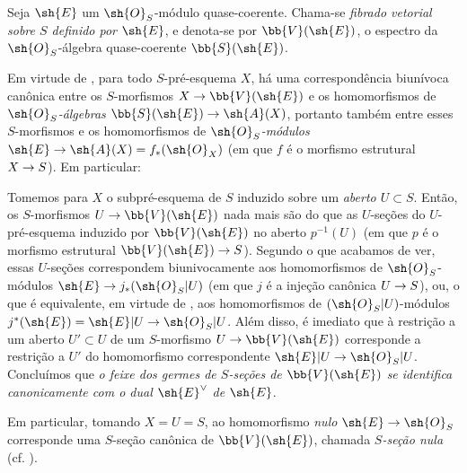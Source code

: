 \documentclass[oneside,10pt]{amsart}
\makeatletter
\providecommand{\dual}{}\renewcommand{\dual}[1]{{#1}^{\vee}}
\newcommand{\ega@arrow}[2]{\mathchoice{#1}{#2}{#2}{#2}}
\renewcommand{\to}{\ega@arrow{\longrightarrow}{\rightarrow}}
\newcommand{\oldpage}[2][]{\marginnote{\normalfont\footnotesize\textbf{#1}~|~#2}\ignorespaces}
\let\EGAOriginalLabel\label
\renewcommand{\label}[1]{\phantomsection\EGAOriginalLabel{#1}}
\makeatother
\begin{document}
\begin{definition}[1.7.8]
\label{II.1.7.8}
Seja $\sh{E}$ um $\sh{O}_S$-módulo quase-coerente.
Chama-se \emph{fibrado vetorial sobre $S$ definido por $\sh{E}$}, e denota-se por $\bb{V}(\sh{E})$, o espectro  da $\sh{O}_S$-álgebra quase-coerente $\bb{S}(\sh{E})$.
\end{definition}

Em virtude de , para todo $S$-pré-esquema $X$, há uma correspondência biunívoca canônica entre os $S$-morfismos $X\to\bb{V}(\sh{E})$ e os homomorfismos de \emph{$\sh{O}_S$-álgebras $\bb{S}(\sh{E})\to\sh{A}(X)$}, portanto também entre esses $S$-morfismos e os homomorfismos de \emph{$\sh{O}_S$-módulos $\sh{E}\to\sh{A}(X)=f_*(\sh{O}_X)$} (em que $f$ é o morfismo estrutural $X\to S$).
Em particular:
\begin{env}[1.7.9]
\label{II.1.7.9}
Tomemos para $X$ o subpré-esquema de $S$ induzido sobre um \emph{aberto $U\subset S$}.
Então, os $S$-morfismos $U\to\bb{V}(\sh{E})$ nada mais são do que as $U$-seções  do $U$-pré-esquema induzido por $\bb{V}(\sh{E})$ no aberto $p^{-1}(U)$ (em que $p$ é o morfismo estrutural $\bb{V}(\sh{E})\to S$).
Segundo o que acabamos de ver, essas $U$-seções correspondem biunivocamente aos homomorfismos de $\sh{O}_S$-módulos $\sh{E}\to j_*(\sh{O}_S|U)$ (em que $j$ é a injeção canônica $U\to S$), ou,
\oldpage[II]{17}
o que é equivalente, em virtude de , aos homomorfismos de $(\sh{O}_S|U)$-módulos $j^*(\sh{E})=\sh{E}|U\to\sh{O}_S|U$.
Além disso, é imediato que à restrição a um aberto $U'\subset U$ de um $S$-morfismo $U\to\bb{V}(\sh{E})$ corresponde a restrição a $U'$ do homomorfismo correspondente $\sh{E}|U\to\sh{O}_S|U$.
Concluímos que \emph{o feixe dos germes de $S$-seções de $\bb{V}(\sh{E})$ se identifica canonicamente com o dual $\dual{\sh{E}}$ de $\sh{E}$}.

Em particular, tomando $X=U=S$, ao homomorfismo \emph{nulo} $\sh{E}\to\sh{O}_S$ corresponde uma $S$-seção canônica de $\bb{V}(\sh{E})$, chamada \emph{$S$-seção nula} (cf. ).
\end{env}
\end{document}
